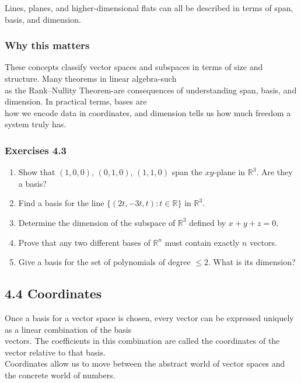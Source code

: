 \documentclass[
  12pt,
  a4paper,
]{article}
\begin{document}
Lines, planes, and higher-dimensional flats can all be described in
terms of span, basis, and dimension.

\subsubsection{Why this matters}\label{why-this-matters-14}

These concepts classify vector spaces and subspaces in terms of size and
structure. Many theorems in linear algebra-such\\
as the Rank--Nullity Theorem-are consequences of understanding span,
basis, and dimension. In practical terms, bases are\\
how we encode data in coordinates, and dimension tells us how much
freedom a system truly has.

\subsubsection{Exercises 4.3}\label{exercises-43}

\begin{enumerate}
\def\labelenumi{\arabic{enumi}.}
\item
  Show that \((1,0,0)\), \((0,1,0)\), \((1,1,0)\) span the \(xy\)-plane
  in \(\mathbb{R}^3\). Are they a basis?
\item
  Find a basis for the line \(\{(2t,-3t,t) : t \in \mathbb{R}\}\) in
  \(\mathbb{R}^3\).
\item
  Determine the dimension of the subspace of \(\mathbb{R}^3\) defined by
  \(x+y+z=0\).
\item
  Prove that any two different bases of \(\mathbb{R}^n\) must contain
  exactly \(n\) vectors.
\item
  Give a basis for the set of polynomials of degree \(\leq 2\). What is
  its dimension?
\end{enumerate}

\subsection{4.4 Coordinates}\label{44-coordinates}

Once a basis for a vector space is chosen, every vector can be expressed
uniquely as a linear combination of the basis\\
vectors. The coefficients in this combination are called the coordinates
of the vector relative to that basis.\\
Coordinates allow us to move between the abstract world of vector spaces
and the concrete world of numbers.
\end{document}
